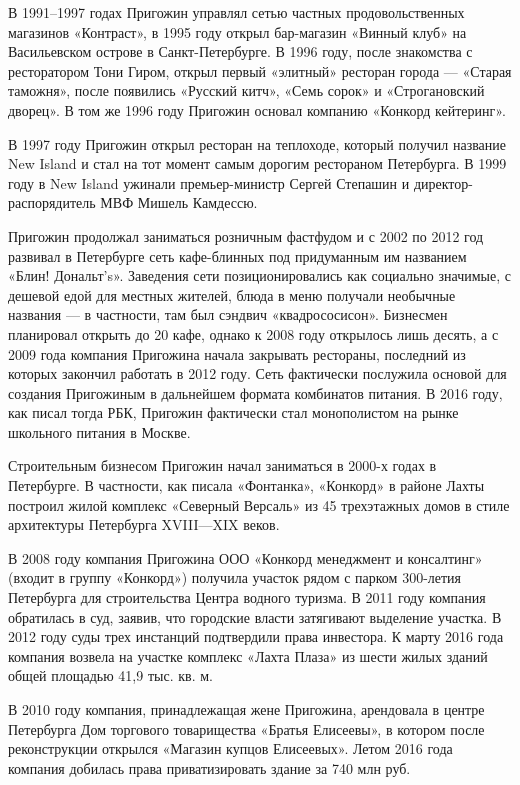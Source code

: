 В 1991–1997 годах Пригожин управлял сетью частных продовольственных магазинов «Контраст», в 1995 году открыл бар-магазин «Винный клуб» на Васильевском острове в Санкт-Петербурге. В 1996 году, после знакомства с ресторатором Тони Гиром, открыл первый «элитный» ресторан города — «Старая таможня», после появились «Русский китч», «Семь сорок» и «Строгановский дворец».
В том же 1996 году Пригожин основал компанию «Конкорд кейтеринг».

В 1997 году Пригожин открыл ресторан на теплоходе, который получил название New Island и стал на тот момент самым дорогим рестораном Петербурга.
В 1999 году в New Island ужинали премьер-министр Сергей Степашин и директор-распорядитель МВФ Мишель Камдессю.

Пригожин продолжал заниматься розничным фастфудом и с 2002 по 2012 год развивал в Петербурге сеть кафе-блинных под придуманным им названием «Блин! Дональт's». Заведения сети позиционировались как социально значимые, с дешевой едой для местных жителей, блюда в меню получали необычные названия — в частности, там был сэндвич «квадрососисон». Бизнесмен планировал открыть до 20 кафе, однако к 2008 году открылось лишь десять, а с 2009 года компания Пригожина начала закрывать рестораны, последний из которых закончил работать в 2012 году. Сеть фактически послужила основой для создания Пригожиным в дальнейшем формата комбинатов питания. В 2016 году, как писал тогда РБК, Пригожин фактически стал монополистом на рынке школьного питания в Москве.

Строительным бизнесом Пригожин начал заниматься в 2000-х годах в Петербурге. В частности, как писала «Фонтанка», «Конкорд» в районе Лахты построил жилой комплекс «Северный Версаль» из 45 трехэтажных домов в стиле архитектуры Петербурга XVIII—XIX веков.

В 2008 году компания Пригожина ООО «Конкорд менеджмент и консалтинг» (входит в группу «Конкорд») получила участок рядом с парком 300-летия Петербурга для строительства Центра водного туризма. В 2011 году компания обратилась в суд, заявив, что городские власти затягивают выделение участка. В 2012 году суды трех инстанций подтвердили права инвестора. К марту 2016 года компания возвела на участке комплекс «Лахта Плаза» из шести жилых зданий общей площадью 41,9 тыс. кв. м.

В 2010 году компания, принадлежащая жене Пригожина, арендовала в центре Петербурга Дом торгового товарищества «Братья Елисеевы», в котором после реконструкции открылся «Магазин купцов Елисеевых». Летом 2016 года компания добилась права приватизировать здание за 740 млн руб.

